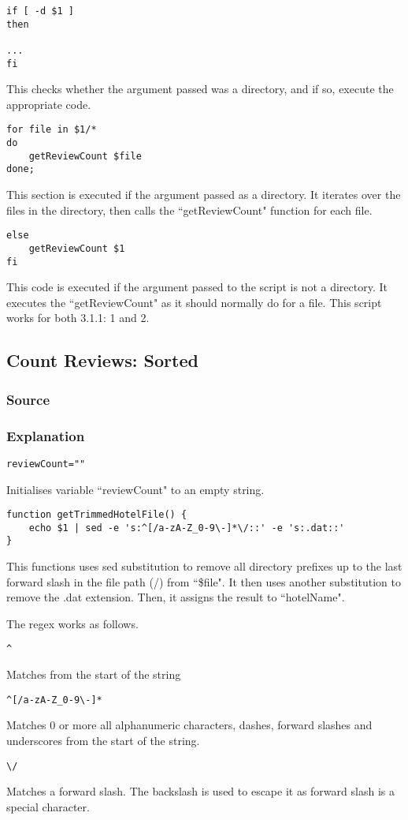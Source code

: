 \documentclass[a4paper]{article}
\begin{document}
\begin{lstlisting}
if [ -d $1 ]
then

...
fi
\end{lstlisting}
This checks whether the argument passed was a directory, and if so, execute the appropriate code.

\begin{lstlisting}
for file in $1/*
do
	getReviewCount $file
done;
\end{lstlisting}
This section is executed if the argument passed as a directory.
It iterates over the files in the directory, then calls the ``getReviewCount" function for each file.

\begin{lstlisting}
else
	getReviewCount $1
fi
\end{lstlisting}
This code is executed if the argument passed to the script is not a directory.
It executes the ``getReviewCount" as it should normally do for a file. \newline \newline
This script works for both 3.1.1: 1 and 2.

%
\newpage
\subsection{Count Reviews: Sorted}
\subsubsection{Source}


\subsubsection{Explanation}
\begin{lstlisting}
reviewCount=""
\end{lstlisting}
Initialises variable ``reviewCount" to an empty string.

\begin{lstlisting}
function getTrimmedHotelFile() {
	echo $1 | sed -e 's:^[/a-zA-Z_0-9\-]*\/::' -e 's:.dat::'
}
\end{lstlisting}
This functions uses sed substitution to remove all directory prefixes up to the last forward slash in the file path (/) from ``\$file".
It then uses another substitution to remove the .dat extension.
Then, it assigns the result to ``hotelName".

The regex works as follows.
\begin{lstlisting}
^
\end{lstlisting}
Matches from the start of the string
\begin{lstlisting}
^[/a-zA-Z_0-9\-]*
\end{lstlisting}
Matches 0 or more all alphanumeric characters, dashes, forward slashes and underscores from the start of the string.
\begin{lstlisting}
\/
\end{lstlisting}
Matches a forward slash. The backslash is used to escape it as forward slash is a special character.
\end{document}
